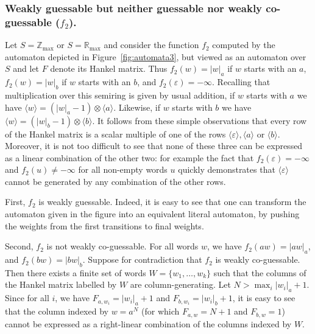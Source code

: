 \documentclass[10pt,a4paper]{amsart}
\theoremstyle{definition}
\numberwithin{equation}{section}
\numberwithin{theorem}{section}
\begin{document}
	\subsubsection*{\textbf{Weakly guessable but neither guessable nor weakly co-guessable ($f_2$)}.}
\label{app:examplef2}
	Let $S=\mathbb{Z}_{\max}$ or $S=\mathbb{R}_{\max}$ and consider the function $f_2$  computed by the automaton depicted in Figure~\ref{fig:automata3}, but viewed as an automaton over $S$ and let $F$ denote its Hankel matrix. Thus $f_2(w) = |w|_a$ if $w$ starts with an $a$, $f_2(w) = |w|_b$ if $w$ starts with an $b$, and $f_2(\varepsilon) = -\infty$.  Recalling that multiplication over this semiring 
    is given by usual addition, if $w$ starts with $a$ we have $\langle w \rangle = (|w|_a - 1) \otimes \langle a \rangle$. Likewise, if $w$ starts with $b$ we have $\langle w \rangle = (|w|_b - 1) \otimes \langle b \rangle$. It follows from these simple observations that every row of the Hankel matrix is a scalar multiple of one of the rows $\langle \varepsilon \rangle, \langle a \rangle$ or $\langle b \rangle$. Moreover, it is not too difficult to see that none of these three can be expressed as a linear combination of the other two: for example the fact that $f_2(\varepsilon)= -\infty$ and $f_2(u) \neq -\infty$ for all non-empty words $u$ quickly demonstrates that $\langle \varepsilon \rangle$ cannot be generated by any combination of the other rows.
	
	First, $f_2$ is weakly guessable. Indeed, it is easy to see that one can transform the automaton given in the figure into an equivalent literal automaton, by pushing the weights from the first transitions to final weights. 
	
	Second, $f_2$ is not weakly co-guessable. For all words $w$, we have $f_2(aw) = |aw|_a$, and $f_2(bw) = |bw|_b$. Suppose for contradiction that $f_2$ is weakly co-guessable. Then there exists a finite set of words $W=\{w_1, \ldots ,w_k\}$ such that the columns of the Hankel matrix labelled by $W$ are column-generating. Let $N> \max_i|w_i|_a + 1$. Since for all $i$, we have $F_{a, w_i} = |w_i|_a + 1$ and $F_{b, w_i} = |w_i|_b+1$, it is easy to see that the column indexed by $w = a^N$ (for which $F_{a, w} = N+1$ and $F_{b, w} = 1$) cannot be expressed as a right-linear combination of the columns indexed by $W$.
	
\end{document}
